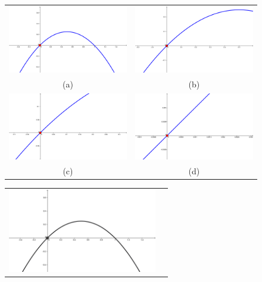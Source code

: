 \begin{figure}[htb]
\begin{center}
\begin{enColor}
\begin{tabular}{cc}
\includegraphics[width=6.5cm]{../fig/Cap10-ZoomEnParabola01.png}&
\includegraphics[width=6.5cm]{../fig/Cap10-ZoomEnParabola02.png}\\
(a)&(b)\\
\includegraphics[width=6.5cm]{../fig/Cap10-ZoomEnParabola03.png}&
\includegraphics[width=6.5cm]{../fig/Cap10-ZoomEnParabola04.png}\\
(c)&(d)
\end{tabular}
\end{enColor}
\begin{bn}
\begin{tabular}{cc}
\includegraphics[width=6.5cm]{../fig/Cap10-ZoomEnParabola01-bn.png}&

\end{tabular}
\end{bn}
\end{center}
\end{figure}

